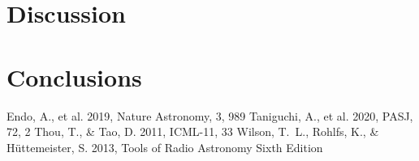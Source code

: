 \documentclass[a4paper,10pt,oneside,twocolumn,notitlepage,final]{jarticle}
\begin{document}
\section{Discussion}
\label{s:discussion}


\section{Conclusions}

\small
\begin{thebibliography}{99}
    Endo, A., et al. 2019, Nature Astronomy, 3, 989
    Taniguchi, A., et al. 2020, PASJ, 72, 2
    Thou, T., \& Tao, D. 2011, ICML-11, 33
    Wilson, T.~L., Rohlfs, K., \& H\"{u}ttemeister, S. 2013, Tools of Radio Astronomy Sixth Edition
\end{thebibliography}
\end{document}
